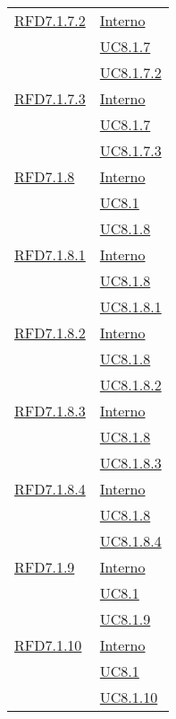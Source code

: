 \begin{longtable}{|>{\centering}m{5cm}|m{5cm}<{\centering}|}
\hyperlink{RFD7.1.7.2}{RFD7.1.7.2} & \hyperlink{Interno}{Interno}\\
& \hyperref[UC8.1.7]{UC8.1.7}\\
& \hyperref[UC8.1.7.2]{UC8.1.7.2}\\ \hline

\hyperlink{RFD7.1.7.3}{RFD7.1.7.3} & \hyperlink{Interno}{Interno}\\
& \hyperref[UC8.1.7]{UC8.1.7}\\
& \hyperref[UC8.1.7.3]{UC8.1.7.3}\\ \hline

\hyperlink{RFD7.1.8}{RFD7.1.8} & \hyperlink{Interno}{Interno}\\
& \hyperref[UC8.1]{UC8.1}\\
& \hyperref[UC8.1.8]{UC8.1.8}\\ \hline

\hyperlink{RFD7.1.8.1}{RFD7.1.8.1} & \hyperlink{Interno}{Interno}\\
& \hyperref[UC8.1.8]{UC8.1.8}\\
& \hyperref[UC8.1.8.1]{UC8.1.8.1}\\ \hline

\hyperlink{RFD7.1.8.2}{RFD7.1.8.2} & \hyperlink{Interno}{Interno}\\
& \hyperref[UC8.1.8]{UC8.1.8}\\
& \hyperref[UC8.1.8.2]{UC8.1.8.2}\\ \hline

\hyperlink{RFD7.1.8.3}{RFD7.1.8.3} & \hyperlink{Interno}{Interno}\\
& \hyperref[UC8.1.8]{UC8.1.8}\\
& \hyperref[UC8.1.8.3]{UC8.1.8.3}\\ \hline

\hyperlink{RFD7.1.8.4}{RFD7.1.8.4} & \hyperlink{Interno}{Interno}\\
& \hyperref[UC8.1.8]{UC8.1.8}\\
& \hyperref[UC8.1.8.4]{UC8.1.8.4}\\ \hline

\hyperlink{RFD7.1.9}{RFD7.1.9} & \hyperlink{Interno}{Interno}\\
& \hyperref[UC8.1]{UC8.1}\\
& \hyperref[UC8.1.9]{UC8.1.9}\\ \hline

\hyperlink{RFD7.1.10}{RFD7.1.10} & \hyperlink{Interno}{Interno}\\
& \hyperref[UC8.1]{UC8.1}\\
& \hyperref[UC8.1.10]{UC8.1.10}\\ \hline


\end{longtable}
